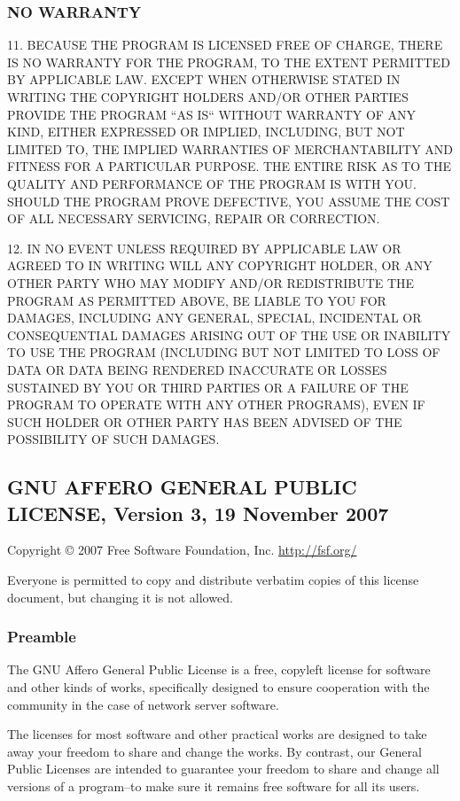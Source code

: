 \documentclass[a4paper, 11pt, twoside]{article}
\begin{document}
\subsubsection{NO WARRANTY}

11. BECAUSE THE PROGRAM IS LICENSED FREE OF CHARGE, THERE IS NO WARRANTY FOR THE PROGRAM, TO THE EXTENT PERMITTED BY APPLICABLE LAW. EXCEPT WHEN OTHERWISE STATED IN WRITING THE COPYRIGHT HOLDERS AND/OR OTHER PARTIES PROVIDE THE PROGRAM “AS IS“ WITHOUT WARRANTY OF ANY KIND, EITHER EXPRESSED OR IMPLIED, INCLUDING, BUT NOT LIMITED TO, THE IMPLIED WARRANTIES OF MERCHANTABILITY AND FITNESS FOR A PARTICULAR PURPOSE. THE ENTIRE RISK AS TO THE QUALITY AND PERFORMANCE OF THE PROGRAM IS WITH YOU. SHOULD THE PROGRAM PROVE DEFECTIVE, YOU ASSUME THE COST OF ALL NECESSARY SERVICING, REPAIR OR CORRECTION.

12. IN NO EVENT UNLESS REQUIRED BY APPLICABLE LAW OR AGREED TO IN WRITING WILL ANY COPYRIGHT HOLDER, OR ANY OTHER PARTY WHO MAY MODIFY AND/OR REDISTRIBUTE THE PROGRAM AS PERMITTED ABOVE, BE LIABLE TO YOU FOR DAMAGES, INCLUDING ANY GENERAL, SPECIAL, INCIDENTAL OR CONSEQUENTIAL DAMAGES ARISING OUT OF THE USE OR INABILITY TO USE THE PROGRAM (INCLUDING BUT NOT LIMITED TO LOSS OF DATA OR DATA BEING RENDERED INACCURATE OR LOSSES SUSTAINED BY YOU OR THIRD PARTIES OR A FAILURE OF THE PROGRAM TO OPERATE WITH ANY OTHER PROGRAMS), EVEN IF SUCH HOLDER OR OTHER PARTY HAS BEEN ADVISED OF THE POSSIBILITY OF SUCH DAMAGES.

\subsection{GNU AFFERO GENERAL PUBLIC LICENSE, Version 3, 19 November 2007}

Copyright © 2007 Free Software Foundation, Inc. \href{http://fsf.org/}{http://fsf.org/}

Everyone is permitted to copy and distribute verbatim copies of this license document, but changing it is not allowed.

\subsubsection{Preamble}

The GNU Affero General Public License is a free, copyleft license for software and other kinds of works, specifically designed to ensure cooperation with the community in the case of network server software.

The licenses for most software and other practical works are designed to take away your freedom to share and change the works. By contrast, our General Public Licenses are intended to guarantee your freedom to share and change all versions of a program--to make sure it remains free software for all its users.
\end{document}
